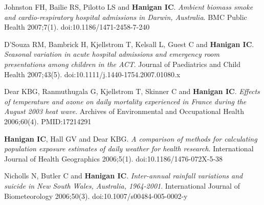 \documentclass[a4paper,11pt]{article}
\begin{document}
\begin{revnumerate}
\item Johnston FH, Bailie RS, Pilotto LS and \textbf{Hanigan IC}. \emph{Ambient biomass smoke and cardio-respiratory hospital admissions in Darwin, Australia}. BMC Public Health 2007;7(1). doi:10.1186/1471-2458-7-240

\item D’Souza RM, Bambrick H, Kjellstrom T, Kelsall L, Guest C and \textbf{Hanigan IC}. \emph{Seasonal variation in acute hospital admissions and emergency room presentations among children in the ACT}. Journal of Paediatrics and Child Health 2007;43(5). doi:10.1111/j.1440-1754.2007.01080.x

\item Dear KBG, Ranmuthugala G, Kjellstrom T, Skinner C and \textbf{Hanigan IC}. \emph{Effects of temperature and ozone on daily mortality experienced in France during the August 2003 heat wave}. Archives of Environmental and Occupational Health 2006;60(4). PMID:17214291

\item \textbf{Hanigan IC}, Hall GV and Dear KBG. \emph{A comparison of methods for calculating population exposure estimates of daily weather for health research}. International Journal of Health Geographics 2006;5(1). doi:10.1186/1476-072X-5-38

\item Nicholls N, Butler C and \textbf{Hanigan IC}. \emph{Inter-annual rainfall variations and suicide in New South Wales, Australia, 1964-2001}. International Journal of Biometeorology 2006;50(3). doi:10.1007/s00484-005-0002-y
\end{revnumerate}
\newpage
\end{document}
